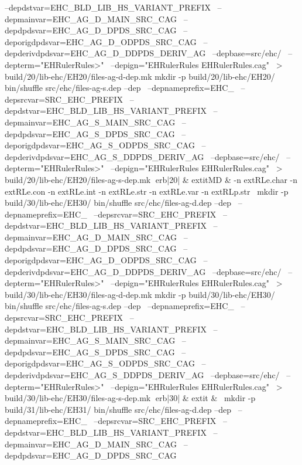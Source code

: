 	  --depdstvar=EHC_BLD_LIB_HS_VARIANT_PREFIX \
	  --depmainvar=EHC_AG_D_MAIN_SRC_CAG \
	  --depdpdsvar=EHC_AG_D_DPDS_SRC_CAG \
	  --deporigdpdsvar=EHC_AG_D_ODPDS_SRC_CAG \
	  --depderivdpdsvar=EHC_AG_D_DDPDS_DERIV_AG \
	  --depbase=src/ehc/ \
	  --depterm="EHRulerRules>" \
	  --depign="EHRulerRules EHRulerRules.cag" \
	    > build/20/lib-ehc/EH20/files-ag-d-dep.mk
mkdir -p build/20/lib-ehc/EH20/
bin/shuffle src/ehc/files-ag-s.dep --dep \
	  --depnameprefix=EHC_ \
	  --depsrcvar=SRC_EHC_PREFIX \
	  --depdstvar=EHC_BLD_LIB_HS_VARIANT_PREFIX \
	  --depmainvar=EHC_AG_S_MAIN_SRC_CAG \
	  --depdpdsvar=EHC_AG_S_DPDS_SRC_CAG \
	  --deporigdpdsvar=EHC_AG_S_ODPDS_SRC_CAG \
	  --depderivdpdsvar=EHC_AG_S_DDPDS_DERIV_AG \
	  --depbase=src/ehc/ \
	  --depterm="EHRulerRules>" \
	  --depign="EHRulerRules EHRulerRules.cag" \
	    > build/20/lib-ehc/EH20/files-ag-s-dep.mk
erb|20| & 	extit{MD} & 
-n 	extRL{e.char}\hspace{.5em} 
-n 	extRL{e.con}\hspace{.5em} 
-n 	extRL{e.int}\hspace{.5em} 
-n 	extRL{e.str}\hspace{.5em} 
-n 	extRL{e.var}\hspace{.5em} 
-n 	extRL{p.str}\hspace{.5em} 
\
mkdir -p build/30/lib-ehc/EH30/
bin/shuffle src/ehc/files-ag-d.dep --dep \
	  --depnameprefix=EHC_ \
	  --depsrcvar=SRC_EHC_PREFIX \
	  --depdstvar=EHC_BLD_LIB_HS_VARIANT_PREFIX \
	  --depmainvar=EHC_AG_D_MAIN_SRC_CAG \
	  --depdpdsvar=EHC_AG_D_DPDS_SRC_CAG \
	  --deporigdpdsvar=EHC_AG_D_ODPDS_SRC_CAG \
	  --depderivdpdsvar=EHC_AG_D_DDPDS_DERIV_AG \
	  --depbase=src/ehc/ \
	  --depterm="EHRulerRules>" \
	  --depign="EHRulerRules EHRulerRules.cag" \
	    > build/30/lib-ehc/EH30/files-ag-d-dep.mk
mkdir -p build/30/lib-ehc/EH30/
bin/shuffle src/ehc/files-ag-s.dep --dep \
	  --depnameprefix=EHC_ \
	  --depsrcvar=SRC_EHC_PREFIX \
	  --depdstvar=EHC_BLD_LIB_HS_VARIANT_PREFIX \
	  --depmainvar=EHC_AG_S_MAIN_SRC_CAG \
	  --depdpdsvar=EHC_AG_S_DPDS_SRC_CAG \
	  --deporigdpdsvar=EHC_AG_S_ODPDS_SRC_CAG \
	  --depderivdpdsvar=EHC_AG_S_DDPDS_DERIV_AG \
	  --depbase=src/ehc/ \
	  --depterm="EHRulerRules>" \
	  --depign="EHRulerRules EHRulerRules.cag" \
	    > build/30/lib-ehc/EH30/files-ag-s-dep.mk
erb|30| & 	extit{} & 
\
mkdir -p build/31/lib-ehc/EH31/
bin/shuffle src/ehc/files-ag-d.dep --dep \
	  --depnameprefix=EHC_ \
	  --depsrcvar=SRC_EHC_PREFIX \
	  --depdstvar=EHC_BLD_LIB_HS_VARIANT_PREFIX \
	  --depmainvar=EHC_AG_D_MAIN_SRC_CAG \
	  --depdpdsvar=EHC_AG_D_DPDS_SRC_CAG \
